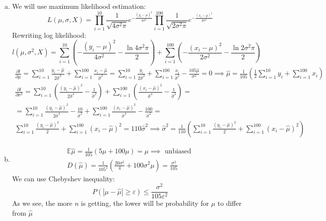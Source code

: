 \documentclass[11pt, oneside]{article}
\begin{document}
\begin{enumerate}[(a)]
	\item We will use maximum likelihood estimation:
	\[
	L(\mu, \sigma, X) = \prod_{i=1}^{10}\frac{1}{\sqrt{4\sigma^{2}\pi}}e^{-\frac{\left(y_{i}-\mu\right)^{2}}{4\sigma^{2}}} \prod_{i=1}^{100}\frac{1}{\sqrt{2\sigma^{2}\pi}}e^{-\frac{\left(x_{i}-\mu\right)^{2}}{2\sigma^{2}}}
	\]
	Rewriting log likelihood:
	\[
	l(\mu, \sigma^{2}, X) = \sum_{i=1}^{10}\left( -\frac{\left(y_{i}-\mu\right)^{2}}{4\sigma^{2}} - \frac{\ln 4\sigma^{2}\pi}{2}\right) + \sum_{i=1}^{100}\left( -\frac{\left(x_{i}-\mu\right)^{2}}{2\sigma^{2}}- \frac{\ln 2\sigma^{2} \pi }{2} \right)
	\]
\begin{gather*}
\frac{\partial l}{\partial \mu} = \sum_{i=1}^{10} \frac{y_{i}-\hat\mu}{2\hat\sigma^{2}} + \sum_{i=1}^{100} \frac{x_{i}-\hat\mu}{\hat\sigma^{2}} = \sum_{i=1}^{10}\frac{y_{i}}{2\hat\sigma^{2}} + \sum_{i=1}^{100}\frac{x_{i}}{\hat\sigma^{2}}  - \frac{105\hat\mu}{\sigma^{2}}  = 0 \implies \hat\mu = \frac{1}{105}\left(\frac{1}{2}\sum_{i=1}^{10}y_{i} + \sum_{i=1}^{100} x_{i}\right) \\
\frac{\partial l}{\partial \sigma^{2}} = \sum_{i=1}^{10}\left( \frac{\left(y_{i}-\hat\mu\right)^{2}}{2\hat\sigma^{4}} - \frac{1}{\hat\sigma^{2}}\right) + \sum_{i=1}^{100}\left( \frac{\left(x_{i}-\hat\mu\right)^{2}}{\hat\sigma^{4}}- \frac{1}{\hat\sigma^{2}} \right) =  \\
= \sum_{i=1}^{10} \frac{\left(y_{i}-\hat\mu\right)^{2}}{2\hat\sigma^{4}} - \frac{10}{\hat\sigma^{2}} + \sum_{i=1}^{100} \frac{\left(x_{i}-\hat\mu\right)^{2}}{\hat\sigma^{4}}- \frac{100}{\hat\sigma^{2}} = \\
\sum_{i=1}^{10} \frac{\left(y_{i}-\hat\mu\right)^{2}}{2}  + \sum_{i=1}^{100} \left(x_{i}-\hat\mu\right)^{2} = 110\hat\sigma^{2} \implies \hat\sigma^{2} = \frac{1}{110}\left(  \sum_{i=1}^{10} \frac{\left(y_{i}-\hat\mu\right)^{2}}{2}  + \sum_{i=1}^{100} \left(x_{i}-\hat\mu\right)^{2}\right)
\end{gather*}
\item 
\begin{gather*}
\mathbb{E} \hat\mu= \frac{1}{105}\left(5\mu + 100 \mu\right)  = \mu \implies \text{ unbiased } \\
D(\hat\mu) = \frac{1}{105^{2}}\left(\frac{20\sigma^{2}}{4} + 100\sigma^{2} \mu\right)  = \frac{\sigma^{2}}{105}
\end{gather*}
We can use Chebyshev inequality:
\[
P\left( | \mu - \hat{\mu}| \ge \varepsilon \right) \le \frac{\sigma^{2}}{105\varepsilon^{2}}
\]
As we see, the more $ n $ is getting, the lower will be probability for $ \mu $ to differ from $ \hat\mu $

\end{enumerate}
\end{document}
